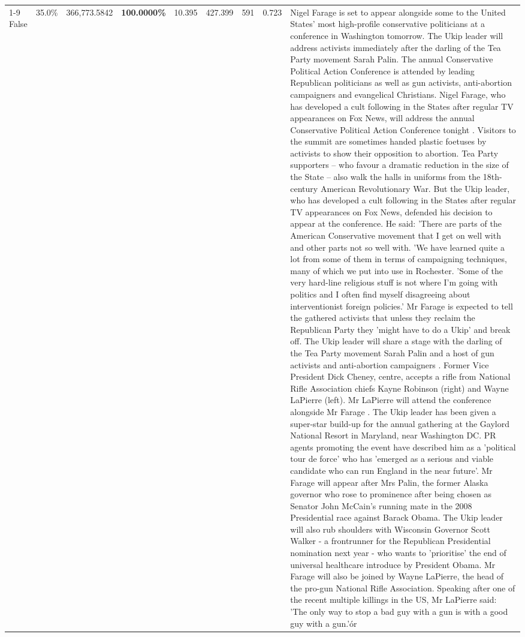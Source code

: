 \begin{table}[H]
\begin{tabular}{lllrlllll}
\cline{1-9}
False & 35.0\% & 366,773.5842 & \bfseries \color{red} 100.0000\% & 10.395 & 427.399 & 591 & 0.723 & Nigel Farage is set to appear alongside some to the United States' most high-profile conservative politicians at a conference in Washington tomorrow. The Ukip leader will address activists immediately after the darling of the Tea Party movement Sarah Palin. The annual Conservative Political Action Conference is attended by leading Republican politicians as well as gun activists, anti-abortion campaigners and evangelical Christians. Nigel Farage, who has developed a cult following in the States after regular TV appearances on Fox News, will address the annual Conservative Political Action Conference tonight . Visitors to the summit are sometimes handed plastic foetuses by activists to show their opposition to abortion. Tea Party supporters – who favour a dramatic reduction in the size of the State – also walk the halls in uniforms from the 18th-century American Revolutionary War. But the Ukip leader, who has developed a cult following in the States after regular TV appearances on Fox News, defended his decision to appear at the conference. He said: 'There are parts of the American Conservative movement that I get on well with and other parts not so well with. 'We have learned quite a lot from some of them in terms of campaigning techniques, many of which we put into use in Rochester. 'Some of the very hard-line religious stuff is not where I'm going with politics and I often find myself disagreeing about interventionist foreign policies.' Mr Farage is expected to tell the gathered activists that unless they reclaim the Republican Party they 'might have to do a Ukip' and break off. The Ukip leader will share a stage with the darling of the Tea Party movement Sarah Palin and a host of gun activists and anti-abortion campaigners . Former Vice President Dick Cheney, centre, accepts a rifle from National Rifle Association chiefs Kayne Robinson (right) and Wayne LaPierre (left). Mr LaPierre will attend the conference alongside Mr Farage . The Ukip leader has been given a super-star build-up for the annual gathering at the Gaylord National Resort in Maryland, near Washington DC. PR agents promoting the event have described him as a 'political tour de force' who has 'emerged as a serious and viable candidate who can run England in the near future'. Mr Farage will appear after Mrs Palin, the former Alaska governor who rose to prominence after being chosen as Senator John McCain's running mate in the 2008 Presidential race against Barack Obama. The Ukip leader will also rub shoulders with Wisconsin Governor Scott Walker - a frontrunner for the Republican Presidential nomination next year - who wants to 'prioritise' the end of universal healthcare introduce by President Obama. Mr Farage will also be joined by Wayne LaPierre, the head of the pro-gun National Rifle Association. Speaking after one of the recent multiple killings in the US, Mr LaPierre said: 'The only way to stop a bad guy with a gun is with a good guy with a gun.'ór \\

\end{tabular}
\end{table}
